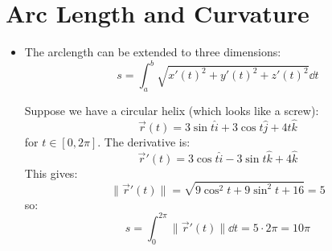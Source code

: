 \section{Arc Length and Curvature}
\begin{itemize}
    \item The arclength can be extended to three dimensions:
    \begin{equation}
        s = \int_a^b \sqrt{x'(t)^2 + y'(t)^2 + z'(t)^2} \dd{t}
    \end{equation}
    \begin{example}
        Suppose we have a circular helix (which looks like a screw):
        \begin{equation}
            \vec{r}(t) = 3\sin t \hat{i} + 3\cos t\hat{j} + 4t\hat{k}
        \end{equation}
        for $t \in [0, 2\pi]$. The derivative is:
        \begin{equation}
            \vec{r}'(t) = 3\cos t \hat{i} - 3\sin t\hat{k} + 4\hat{k}
        \end{equation}
        This gives:
        \begin{equation}
            \lVert \vec{r}'(t) \rVert = \sqrt{9\cos^2 t + 9\sin^2 t + 16} = 5
        \end{equation}
        so:
        \begin{equation}
            s = \int_0^{2\pi} \lVert \vec{r}'(t) \rVert \dd{t} = 5 \cdot 2\pi = 10\pi
        \end{equation}
    \end{example}
\end{itemize}